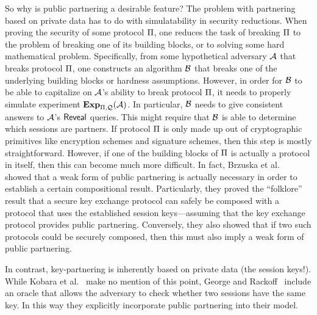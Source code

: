 So why is public partnering a desirable feature?
The problem with partnering based on private data has to do with simulatability in security reductions.
When proving the security of some protocol $\protocol$,
one reduces the task of breaking $\protocol$ to the problem of breaking one of its building blocks,
or to solving some hard mathematical problem.
Specifically,
from some hypothetical adversary $\A$ that breaks protocol $\protocol$,
one constructs an algorithm $\A[B]$ that breaks one of the underlying building blocks or hardness assumptions.
However,
in order for $\A[B]$ to be able to capitalize on $\A$'s ability to break protocol $\protocol$,
it needs to properly simulate experiment $\Expdefault$.
In particular,
$\A[B]$ needs to give consistent answers to $\A$'s $\Reveal$ queries.
This might require that $\A[B]$ is able to determine which sessions are partners.
If protocol $\protocol$ is only made up  out of cryptographic primitives like encryption schemes and signature schemes,
then this step is mostly straightforward.
However,
if one of the building blocks of $\protocol$ is actually a protocol in itself,
then this can become much more difficult.
In fact,
Brzuska et al.~\cite{CCS:BFWW11} showed that a weak form of public partnering is actually necessary in order to establish a certain compositional result.
Particularly,
they proved the ``folklore'' result that a secure key exchange protocol can safely be composed with a protocol that uses the established session keys---assuming that the key exchange protocol provides public partnering.
Conversely,
they also showed that if two such protocols could be securely composed,
then this must also imply a weak form of public partnering.

In contrast,
key-partnering is inherently based on private data (the session keys!).   
While Kobara et al.~\cite{ASIACCS:KobShiStr09} make no mention of this point,
George and Rackoff~\cite{EPRINT:GeoRac13} include an oracle that allows the adversary to check whether two sessions have the same key.
In this way they explicitly incorporate public partnering into their model.


